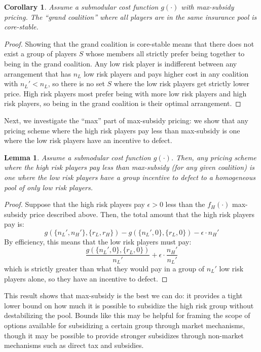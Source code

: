 \documentclass[sigconf]{acmart}
\newtheorem{lemma}{Lemma}
\newtheorem{corollary}{Corollary}
\newcommand{\nL}[0]{\ensuremath{n_L}}
\newcommand{\nH}[0]{\ensuremath{n_H}}
\newcommand{\rL}[0]{\ensuremath{r_L}}
\newcommand{\rH}[0]{\ensuremath{r_H}}
\newcommand{\cost}[0]{\ensuremath{g}}
\newcommand{\priceH}[0]{\ensuremath{f_H}}
\newcommand{\cd}[0]{\cdot}
\begin{document}
\begin{corollary}
Assume a submodular cost function $\cost(\cd)$ with max-subsidy pricing. The \enquote{grand coalition} where all players are in the same insurance pool is core-stable. 
\end{corollary}

\begin{proof}
Showing that the grand coalition is core-stable means that there does not exist a group of players $S$ whose members all strictly prefer being together to being in the grand coalition. Any low risk player is indifferent between any arrangement that has $\nL$ low risk players and pays higher cost in any coalition with $\nL'<\nL$, so there is no set $S$ where the low risk players get strictly lower price. High risk players most prefer being with more low risk players and high risk players, so being in the grand coalition is their optimal arrangement. 
\end{proof}

Next, we investigate the \enquote{max} part of max-subsidy pricing: we show that any pricing scheme where the high risk players pay less than max-subsidy is one where the low risk players have an incentive to defect. 
\begin{lemma}
Assume a submodular cost function $\cost(\cd)$. Then, any pricing scheme where the high risk players pay less than max-subsidy (for any given coalition) is one where the low risk players have a group incentive to defect to a homogeneous pool of only low risk players. 
\end{lemma}
\begin{proof}
Suppose that the high risk players pay $\epsilon > 0$ less than the $\priceH(\cdot)$ max-subsidy price described above. Then, the total amount that the high risk players pay is: 
$$\cost(\{\nL',\nH' \}, \{\rL, \rH\}) - \cost(\{\nL',0 \}, \{\rL, 0\}) - \epsilon \cd \nH'$$
By efficiency, this means that the low risk players must pay: 
$$  \frac{\cost(\{\nL',0 \}, \{\rL, 0\})}{\nL'} + \epsilon \cd \frac{\nH'}{\nL'}$$
which is strictly greater than what they would pay in a group of $\nL'$ low risk players alone, so they have an incentive to defect. 
\end{proof}
This result shows that max-subsidy is the best we can do: it provides a tight lower bound on how much it is possible to subsidize the high risk group without destabilizing the pool. Bounds like this may be helpful for framing the scope of options available for subsidizing a certain group through market mechanisms, though it may be possible to provide stronger subsidizes through non-market mechanisms such as direct tax and subsidies. 
\end{document}
